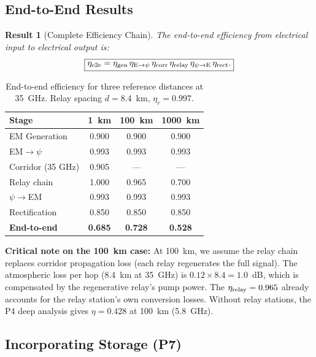 \documentclass[aps,prd,twocolumn,superscriptaddress]{revtex4-2}
\newtheorem{result}{Result}
\begin{document}
\subsection{End-to-End Results}

\begin{result}[Complete Efficiency Chain]
The end-to-end efficiency from electrical input to electrical output is:
\begin{equation}
\boxed{
\eta_{\rm e2e} = \eta_{\rm gen}\,\eta_{\rm E\to\psi}\,
\eta_{\rm corr}\,\eta_{\rm relay}\,
\eta_{\psi\to\rm E}\,\eta_{\rm rect}.
}
\end{equation}
\end{result}

\begin{table}[h]
\caption{End-to-end efficiency for three reference distances at 35~GHz.
Relay spacing $d = 8.4$~km, $\eta_r = 0.997$.}
\label{tab:e2e}
\begin{ruledtabular}
\begin{tabular}{lccc}
Stage & 1~km & 100~km & 1000~km \\
\hline
EM Generation & 0.900 & 0.900 & 0.900 \\
EM$\to\psi$ & 0.993 & 0.993 & 0.993 \\
Corridor (35 GHz) & 0.905 & --- & --- \\
Relay chain & 1.000 & 0.965 & 0.700 \\
$\psi\to$EM & 0.993 & 0.993 & 0.993 \\
Rectification & 0.850 & 0.850 & 0.850 \\
\midrule
\textbf{End-to-end} & \textbf{0.685} & \textbf{0.728} & \textbf{0.528} \\
\end{tabular}
\end{ruledtabular}
\end{table}

\textbf{Critical note on the 100~km case:}  At 100~km, we assume the
relay chain replaces corridor propagation loss (each relay regenerates
the full signal).  The atmospheric loss per hop (8.4~km at 35~GHz) is
$0.12 \times 8.4 = 1.0$~dB, which is compensated by the regenerative
relay's pump power.  The $\eta_{\rm relay} = 0.965$ already accounts
for the relay station's own conversion losses.  Without relay stations,
the P4 deep analysis gives $\eta = 0.428$ at 100~km (5.8~GHz).

\subsection{Incorporating Storage (P7)}
\end{document}
